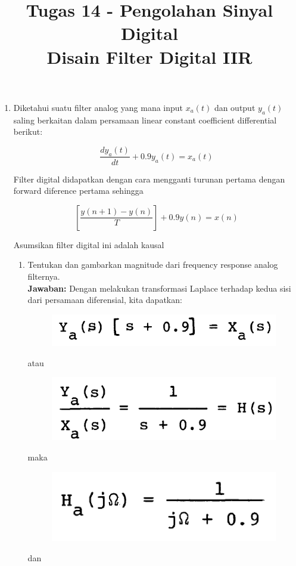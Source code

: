 \documentclass[12pt,a4paper]{article}
\title{Tugas 14 - Pengolahan Sinyal Digital\\
	Disain Filter Digital IIR}
\date{}
\begin{document}
	\maketitle
	\date{}
	\begin{enumerate}
		\item Diketahui suatu filter analog yang mana input $ x_a(t) $ dan output $ y_a(t) $ saling berkaitan dalam persamaan linear constant coefficient differential berikut:
		
		\[ \frac{dy_a(t)}{dt} + 0.9 y_a(t) = x_a(t) \]
		
		Filter digital didapatkan dengan cara mengganti turunan pertama dengan forward diference pertama sehingga
		
		\[ \left[ \frac{y(n+1) - y(n)}{T} \right] + 0.9 y(n) = x(n)  \]
		
		Asumsikan filter digital ini adalah kausal
		\begin{enumerate}
			\item Tentukan dan gambarkan magnitude dari frequency response analog filternya.\\
			\textbf{Jawaban:} Dengan melakukan transformasi Laplace terhadap kedua sisi dari persamaan diferensial, kita dapatkan:

			\begin{figure}[H]
				\centering
				\includegraphics[width=0.3\linewidth]{img/img01}
			\end{figure}
			
			atau
			
			\begin{figure}[H]
				\centering
				\includegraphics[width=0.3\linewidth]{img/img02}
			\end{figure}
			
			maka
			
			\begin{figure}[H]
				\centering
				\includegraphics[width=0.3\linewidth]{img/img03}
			\end{figure}
		
			dan
			

\end{enumerate}
\end{enumerate}
\end{document}

